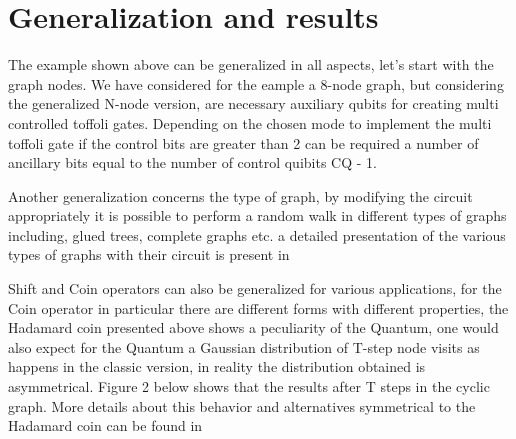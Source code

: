 \section{Generalization and results}

The example shown above can be generalized in all aspects, let's start with the graph nodes.
We have considered for the eample a 8-node graph, but considering the generalized N-node version, are necessary
auxiliary qubits for creating multi controlled toffoli gates. Depending on the chosen mode
to implement the multi toffoli gate if the control bits are greater than 2 can be required 
a number of ancillary bits equal to the number of control quibits CQ - 1.

Another generalization concerns the type of graph, by modifying the circuit appropriately it is possible to
perform a random walk in different types of graphs including, glued trees, complete graphs etc. a 
detailed presentation of the various types of graphs with their circuit is present in \cite{douglas2007efficient}

Shift and Coin operators can also be generalized for various applications, for the Coin operator in
particular there are different forms with different properties, the Hadamard coin presented above shows a peculiarity
of the Quantum, one would also expect for the Quantum a Gaussian distribution of T-step node visits
as happens in the classic version, in reality the distribution obtained is asymmetrical. Figure 2 below shows that 
the results after T steps in the cyclic graph. More details about this behavior and alternatives 
symmetrical to the Hadamard coin can be found in \cite{Kempe_2003}
